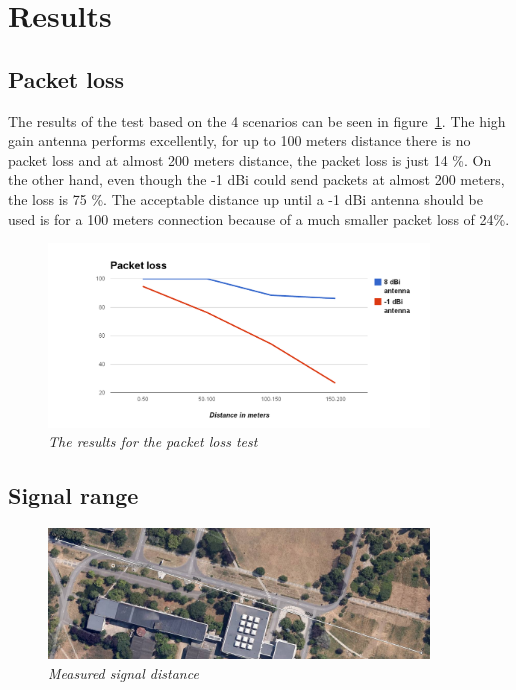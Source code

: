 \section{Results}
 
\subsection{Packet loss}

The results of the test based on the 4 scenarios can be seen in figure~\ref{fig:packet_loss}. The high gain antenna performs excellently, for up to 100 meters distance there is no packet loss and at almost 200 meters distance, the packet loss is just 14 \%. On the other hand, even though the -1 dBi could send packets at almost 200 meters, the loss is 75 \%. The acceptable distance up until a -1 dBi antenna should be used is for a 100 meters connection because of a much smaller packet loss of 24\%. 

\begin{figure}[ht]
\begin{center}
\includegraphics[width=0.9\textwidth]{img/packet_loss.png}
\end{center}
\caption{\small \itshape{The results for the packet loss test}}
  \label{fig:packet_loss}
\end{figure}
 
\subsection{Signal range}

\begin{figure}[ht]
\begin{center}
\includegraphics[width=0.9\textwidth]{img/distance.png}
\end{center}
\caption{\small \itshape{Measured signal distance}}
  \label{fig:distance}
\end{figure}


